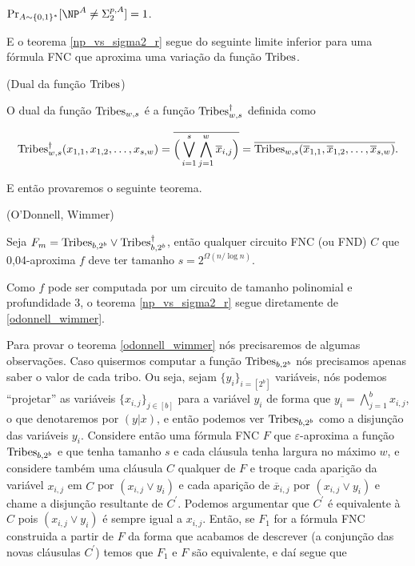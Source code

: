 \begin{teo} \label{np_vs_sigma2_r}
	$\Pr_{A \sim \binalph^{*}}[\NP^{A} \neq \Sigma_{2}^{p, A}] = 1$.
\end{teo}

E o teorema \ref{np_vs_sigma2_r} segue do seguinte limite inferior para uma fórmula FNC que aproxima uma variação da função $\text{Tribes}$.

\begin{defi} (Dual da função $\text{Tribes}$)

O dual da função $\text{Tribes}_{w, s}$ é a função $\text{Tribes}_{w, s}^{\dagger}$ definida como

\begin{equation*}
	\text{Tribes}_{w, s}^{\dagger}(x_{1, 1}, x_{1,2}, \dots, x_{s, w})  = \overline{\Big(\bigvee_{i = 1}^{s}\bigwedge_{j = 1}^{w} \overline{x}_{i, j}\Big)} = \overline{\text{Tribes}_{w, s}(\overline{x}_{1, 1}, \overline{x}_{1, 2}, \dots, \overline{x}_{s, w})}.
\end{equation*}

\end{defi}

E então provaremos o seguinte teorema.

\begin{teo} (O'Donnell, Wimmer) \label{odonnell_wimmer}

Seja $F_{m} = \text{Tribes}_{b, 2^{b}} \lor \text{Tribes}_{b, 2^{b}}^{\dagger}$, então qualquer circuito FNC (ou FND) $C$ que  0,04-aproxima $f$ deve ter tamanho $s = 2^{\Omega(n/\log n)}$.

\end{teo}

Como $f$ pode ser computada por um circuito de tamanho polinomial e profundidade 3, o teorema \ref{np_vs_sigma2_r} segue diretamente de \ref{odonnell_wimmer}.

Para provar o teorema \ref{odonnell_wimmer} nós precisaremos de algumas observações. Caso quisermos computar a função $\text{Tribes}_{b, 2^{b}}$ nós precisamos apenas saber o valor de cada tribo. Ou seja, sejam $\{y_{i}\}_{i = [2^{b}]}$ variáveis, nós podemos ``projetar'' as variáveis $\{x_{i, j}\}_{j \in [b]}$ para a variável $y_{i}$ de forma que $y_{i} = \bigwedge_{j = 1}^{b} x_{i, j}$, o que denotaremos por $(y \lvert x)$, e então podemos ver $\text{Tribes}_{b, 2^{b}}$ como a disjunção das variáveis $y_{i}$. Considere então uma fórmula FNC $F$ que $\varepsilon$-aproxima a função $\text{Tribes}_{b, 2^{b}}$ e que tenha tamanho $s$ e cada cláusula tenha largura no máximo $w$, e considere também uma cláusula $C$ qualquer de $F$ e troque cada aparição da variável $x_{i, j}$ em $C$ por $(x_{i, j} \lor y_{i})$ e cada aparição de $\overline{x}_{i, j}$ por $\overline{(x_{i, j} \lor y_{i})}$ e chame a disjunção resultante de $C^{\prime}$. Podemos argumentar que $C^{\prime}$ é equivalente à $C$ pois $(x_{i, j} \lor y_{i})$ é sempre igual a $x_{i, j}$. Então, se $F_{1}$ for a fórmula FNC construida a partir de $F$ da forma que acabamos de descrever (a conjunção das novas cláusulas $C^{\prime}$) temos que $F_{1}$ e $F$ são equivalente, e daí segue que

